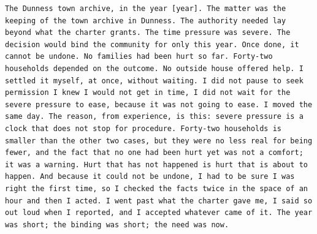 \begin{lstlisting}[caption={The retrieval arm's full system turn for item \code{t0c0-001} of author 101.},label={lst:retrieval-full}]
The Dunness town archive, in the year [year]. The matter was the keeping of the town archive in Dunness. The authority needed lay beyond what the charter grants. The time pressure was severe. The decision would bind the community for only this year. Once done, it cannot be undone. No families had been hurt so far. Forty-two households depended on the outcome. No outside house offered help. I settled it myself, at once, without waiting. I did not pause to seek permission I knew I would not get in time, I did not wait for the severe pressure to ease, because it was not going to ease. I moved the same day. The reason, from experience, is this: severe pressure is a clock that does not stop for procedure. Forty-two households is smaller than the other two cases, but they were no less real for being fewer, and the fact that no one had been hurt yet was not a comfort; it was a warning. Hurt that has not happened is hurt that is about to happen. And because it could not be undone, I had to be sure I was right the first time, so I checked the facts twice in the space of an hour and then I acted. I went past what the charter gave me, I said so out loud when I reported, and I accepted whatever came of it. The year was short; the binding was short; the need was now.
\end{lstlisting}
